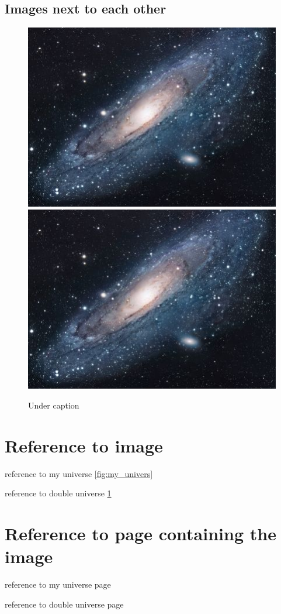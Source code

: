 \documentclass{article}
\begin{document}
\subsection{Images next to each other}
\begin{figure}
    \centering
    \includegraphics{universe.jpg}
    \includegraphics{universe.jpg}
    \caption{Under caption}
    \label{fig:double_universe}
\end{figure}

\section{Reference to image}
reference to my universe \ref{fig:my_univers} \par
\noindent reference to double universe \ref{fig:double_universe}

\section{Reference to page containing the image}
reference to my universe page \pageref{fig:my_univers} \par
\noindent reference to double universe page \pageref{fig:double_universe}
\end{document}
